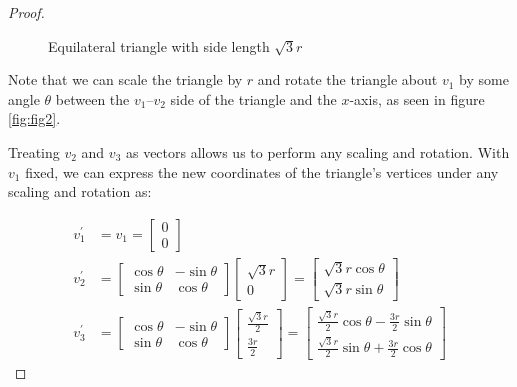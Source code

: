 \documentclass{article}
\begin{document}
\begin{proof}
\begin{figure}[H]
    \caption{Equilateral triangle with side length \(\sqrt{3}r\)}
    \label{fig:fig1}
\end{figure}

Note that we can scale the triangle by $r$ and rotate the triangle about $v_{1}$ by some angle $\theta$ between the $v_{1}$--$v_{2}$ side of the triangle and the $x$-axis, as seen in figure \ref{fig:fig2}.

Treating $v_{2}$ and $v_{3}$ as vectors allows us to perform any scaling and rotation. With $v_{1}$ fixed, we can express the new coordinates of the triangle's vertices under any scaling and rotation as:

\begin{align*}
    v^{\prime}_{1} &= v_{1} =
        \begin{bmatrix}
            0\\
            0
        \end{bmatrix}\\
    v^{\prime}_{2} &= 
        \begin{bmatrix}
            \cos{\theta} & -\sin{\theta}\\
            \sin{\theta} & \cos{\theta}
        \end{bmatrix}
        \begin{bmatrix}
            \sqrt{3}r\\
            0
        \end{bmatrix}
        = 
        \begin{bmatrix}
            \sqrt{3}r\cos{\theta}\\
            \sqrt{3}r\sin{\theta}
        \end{bmatrix} \\
    v^{\prime}_{3} &= 
        \begin{bmatrix}
            \cos{\theta} & -\sin{\theta}\\
            \sin{\theta} & \cos{\theta}
        \end{bmatrix}
        \begin{bmatrix}
            \frac{\sqrt{3}r}{2}\\
            \frac{3r}{2}
        \end{bmatrix}
        = 
        \begin{bmatrix}
            \frac{\sqrt{3}r}{2}\cos{\theta} - \frac{3r}{2}\sin{\theta}\\
            \frac{\sqrt{3}r}{2}\sin{\theta} + \frac{3r}{2}\cos{\theta}
        \end{bmatrix}
\end{align*}


\end{proof}
\end{document}
